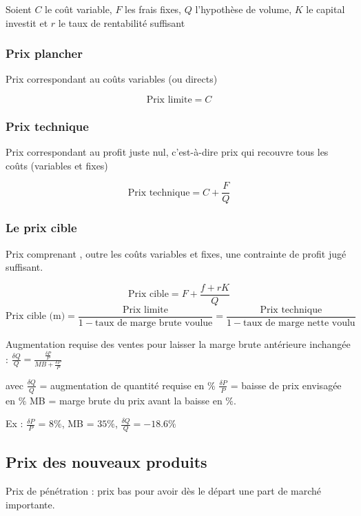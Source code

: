 	
		
		Soient $C$ le coût variable, $F$ les frais fixes, $Q$ l'hypothèse de volume, $K$ le capital investit et $r$ le taux de rentabilité suffisant
			\subsubsection{Prix plancher}
			
			
			Prix correspondant au coûts variables (ou directs)
	
			$$\text{Prix limite} = C$$
	
			\subsubsection{Prix technique}
			
			Prix correspondant au profit juste nul, c'est-à-dire prix qui recouvre tous les coûts (variables et fixes)
						
			$$\text{Prix technique} = C + \frac{F}{Q}$$
			
			\subsubsection{Le prix cible}
	
			Prix comprenant , outre les coûts variables et fixes, une contrainte de profit jugé suffisant.
	
	
	
			$$\text{Prix cible} = F + \frac{f + rK}{Q}$$
			$$\text{Prix cible (m)} = \frac{\text{Prix limite}}{1 - \text{taux de marge brute voulue}} = \frac{\text{Prix technique}}{1 - \text{taux de marge nette voulu}}$$
	
	
	Augmentation requise des ventes pour laisser la marge brute antérieure inchangée : $\frac{\delta Q}{Q} = \frac{ \frac{\delta P}{P}}{MB + \frac{\delta P}{P}}$
	
	avec $ \frac{\delta Q}{Q}$ = augmentation de quantité requise en $\%$
	$ \frac{\delta P}{P}$ = baisse de prix envisagée en $\%$
	MB = marge brute du prix avant la baisse en $\%$.
	
	Ex : $\frac{\delta P}{P}$ = 8$\%$, MB = $35 \%$, $\frac{\delta Q}{Q} = -18.6\%$
	
	
		\subsection{Prix des nouveaux produits}
		
		Prix de pénétration : prix bas pour avoir dès le départ une part de marché importante. \\
	
